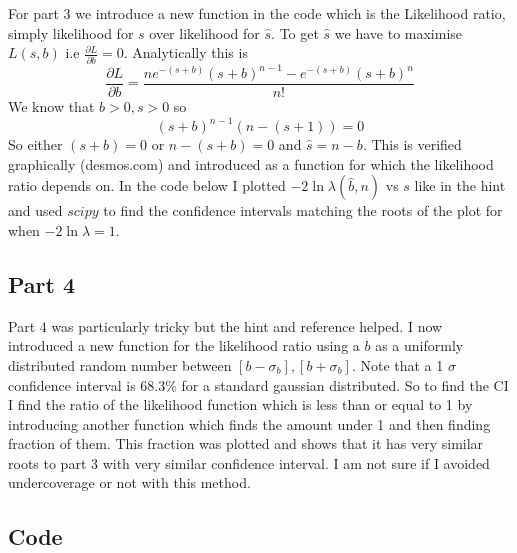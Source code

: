 \documentclass[11pt]{article}
\begin{document}
    For part 3 we introduce a new function in the code which is the
Likelihood ratio, simply likelihood for \(s\) over likelihood for
\(\hat{s}\). To get \(\hat{s}\) we have to maximise \(L(s,b)\) i.e
\(\frac{\partial L}{\partial b} = 0\). Analytically this is
\[ \frac{\partial L}{\partial b} = \frac{n e^{-(s+b)} (s+b)^{n-1} - e^{-(s+b)} (s+b)^n }{n!} \]
We know that \(b > 0, s> 0\) so \[ (s+b)^{n-1} (n-(s+1)) = 0 \] So
either \((s+b) =0\) or \(n-(s+b) = 0\) and \(\hat{s} = n-b\). This is
verified graphically (desmos.com) and introduced as a function for which
the likelihood ratio depends on. In the code below I plotted $-2
\ln \lambda(\hat{b}, n) $ vs \(s\) like in the hint and used \(scipy\)
to find the confidence intervals matching the roots of the plot for when
\(-2 \ln \lambda = 1\).

    \hypertarget{part-4}{%
\subsection{Part 4}\label{part-4}}

    Part 4 was particularly tricky but the hint and reference helped. I now
introduced a new function for the likelihood ratio using a \(b\) as a
uniformly distributed random number between
\([b-\sigma_b], [b+\sigma_b]\). Note that a 1 \(\sigma\) confidence
interval is \(68.3\%\) for a standard gaussian distributed. So to find
the CI I find the ratio of the likelihood function which is less than or
equal to 1 by introducing another function which finds the amount under
1 and then finding fraction of them. This fraction was plotted and shows
that it has very similar roots to part 3 with very similar confidence
interval. I am not sure if I avoided undercoverage or not with this
method.

    \hypertarget{code}{%
\subsection{Code}\label{code}}
\end{document}
